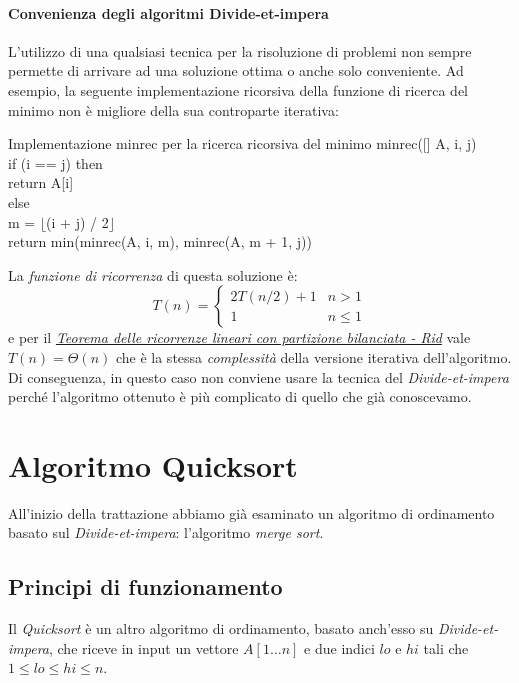 \paragraph{Convenienza degli algoritmi Divide-et-impera}
L'utilizzo di una qualsiasi tecnica per la risoluzione di problemi non sempre
permette di arrivare ad una soluzione ottima o anche solo conveniente.
Ad esempio, la seguente implementazione ricorsiva della funzione di ricerca del
minimo non è migliore della sua controparte iterativa:
\begin{minicode}{Implementazione minrec per la ricerca ricorsiva del minimo}
    \ind{} minrec([] A,  i,  j)\\
        \indf if (i == j) then\\
            return A[i]\\
        \indf else\\
            m = $\lfloor$(i + j) / 2$\rfloor$\\
            return min(minrec(A, i, m), minrec(A, m + 1, j))
\end{minicode}\noindent
La \emph{funzione di ricorrenza} di questa soluzione è:
\[T(n)=\begin{cases}
    2T(n/2)+1 & n>1\\
    1 & n\leq1
\end{cases}\]
e per il \emph{\hyperref[def:19]{Teorema delle ricorrenze lineari con
partizione bilanciata - Rid}} vale $T(n)=\Theta(n)$ che è la stessa
\emph{complessità} della versione iterativa dell'algoritmo. Di conseguenza,
in questo caso non conviene usare la tecnica del \emph{Divide-et-impera} perché
l'algoritmo ottenuto è più complicato di quello che già conoscevamo.

\hypertarget{sec:quick_sort}{\section{Algoritmo Quicksort}}
All'inizio della trattazione abbiamo già esaminato un algoritmo di ordinamento
basato sul \emph{Divide-et-impera}: l'algoritmo \emph{merge sort}.

\subsection{Principi di funzionamento}
Il \emph{Quicksort} è un altro algoritmo di ordinamento, basato anch'esso su
\emph{Divide-et-impera}, che riceve in input un vettore $A[1\dots n]$ e due indici $lo$ e
$hi$ tali che $1\leq lo\leq hi\leq n$.

